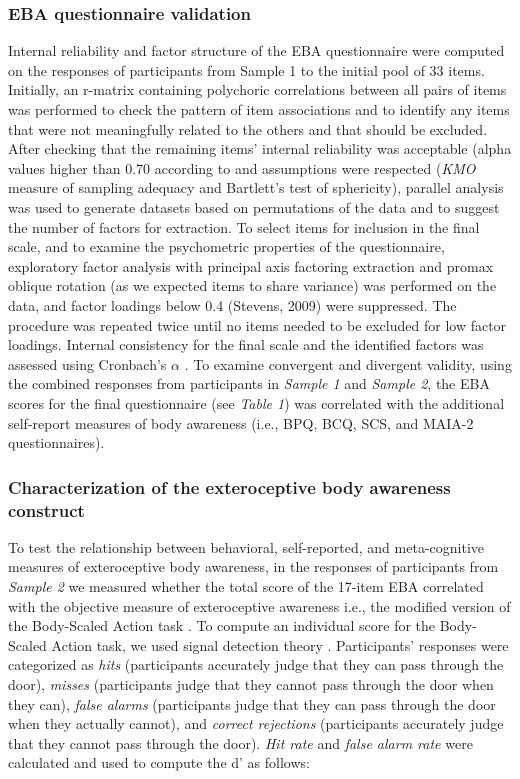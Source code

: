 \documentclass[man]{apa7}
\begin{document}
\subsubsection{EBA questionnaire validation}
Internal reliability and factor structure of the EBA questionnaire were computed on the responses of participants from Sample 1 to the initial pool of 33 items. Initially, an r-matrix containing polychoric correlations between all pairs of items was performed to check the pattern of item associations and to identify any items that were not meaningfully related to the others and that should be excluded. After checking that the remaining items’ internal reliability was acceptable (alpha values higher than 0.70 according to \Textcite {bland1997difference} and assumptions were respected (\emph{KMO} measure of sampling adequacy and Bartlett’s test of sphericity), parallel analysis \parencite{horn1965rationale} was used to generate datasets based on permutations of the data and to suggest the number of factors for extraction. To select items for inclusion in the final scale, and to examine the psychometric properties of the questionnaire, exploratory factor analysis with principal axis factoring extraction and promax oblique rotation (as we expected items to share variance) was performed on the data, and factor loadings below 0.4 (Stevens, 2009) were suppressed. The procedure was repeated twice until no items needed to be excluded for low factor loadings. Internal consistency for the final scale and the identified factors was assessed using Cronbach’s $\alpha$ \parencite{bland1997difference}. To examine convergent and divergent validity, using the combined responses from participants in \emph{Sample 1} and \emph{Sample 2}, the EBA scores for the final questionnaire (see \emph{Table 1}) was correlated with the additional self-report measures of body awareness (i.e., BPQ, BCQ, SCS, and MAIA-2 questionnaires).
\subsubsection{Characterization of the exteroceptive body awareness construct }
To test the relationship between behavioral, self-reported, and meta-cognitive measures of exteroceptive body awareness, in the responses of participants from \emph{Sample 2} we measured whether the total score of the 17-item EBA correlated with the objective measure of exteroceptive awareness i.e., the modified version of the Body-Scaled Action task \parencite{guardia2010anticipation}. To compute an individual score for the Body-Scaled Action task, we used signal detection theory \parencite{stanislaw1999calculation}. Participants’ responses were categorized as \emph{hits} (participants accurately judge that they can pass through the door), \emph{misses} (participants judge that they cannot pass through the door when they can), \emph{false alarms} (participants judge that they can pass through the door when they actually cannot), and \emph{correct rejections} (participants accurately judge that they cannot pass through the door). \emph{Hit rate} and \emph{false alarm rate} were calculated and used to compute the d’ as follows: 
\end{document}
